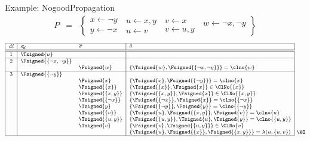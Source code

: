 \begin{frame}{Example: {NogoodPropagation}}
%
\begin{eqnarray*}
P
& = &
\left\{
  \begin{array}{l}
x  \leftarrow  \neg y\\%
y  \leftarrow  \neg x
\end{array}
\
\begin{array}{l}
u  \leftarrow x,y\\%
u  \leftarrow v%
\end{array}
\
\begin{array}{l}
v  \leftarrow x\\%
v  \leftarrow u,y%
\end{array}
\
\begin{array}{l}
w  \leftarrow \neg x,\neg y\\
\mbox{~}
\end{array}
\right\}
\end{eqnarray*}
%
\[
\footnotesize
\begin{array}[b]{|c|ll|l|}
\hline
\mathit{dl}& \sigma_{\!d} & \overline{\sigma} & \delta
\\\hline\hline
1 & \Tsigned{u} & &
\\\hline
2 & \Fsigned{\{\neg x,\neg y\}} & &
\\
  & & \Fsigned{w}     & \{\Tsigned{w},\Fsigned{\{\neg x,\neg y\}}\}=\clno{w}
\\\hline
3 & \Fsigned{\{\neg y\}} & &
\\
  & & \Fsigned{x}     & \{\Tsigned{x},\Fsigned{\{\neg y\}}\}=\clno{x}
\\
  & & \Fsigned{\{x\}} & \{\Tsigned{\{x\}},\Fsigned{x}\}\in\ClNo{\{x\}}
\\
  & & \Fsigned{\{x,y\}} & \{\Tsigned{\{x,y\}},\Fsigned{x}\}\in\ClNo{\{x,y\}}
\\
  & & \Tsigned{\{\neg x\}} & \{\Fsigned{\{\neg x\}},\Fsigned{x}\}=\clno{\{\neg x\}}
\\
  & & \Tsigned{y} & \{\Fsigned{\{\neg y\}},\Fsigned{y}\}=\clno{\{\neg y\}}
\\
  & & \Tsigned{\{v\}} & \{\Tsigned{u},\Fsigned{\{x,y\}},\Fsigned\{v\}\}=\clno{u}
\\
  & & \Tsigned{\{u,y\}} & \{\Fsigned{\{u,y\}},\Tsigned{u},\Tsigned{y}\}=\clno{\{u,y\}}
\\
  & & \Tsigned{v} & \{\Fsigned{v},\Tsigned{\{u,y\}}\}\in\ClNo{v}
\\
  & & & \{\Tsigned{u},\Fsigned{\{x\}},\Fsigned{\{x,y\}}\}=\lambda(u,\{u,v\})
\\\hline
\end{array}
~\raisebox{1mm}{\KO}
\]
\end{frame}
%
